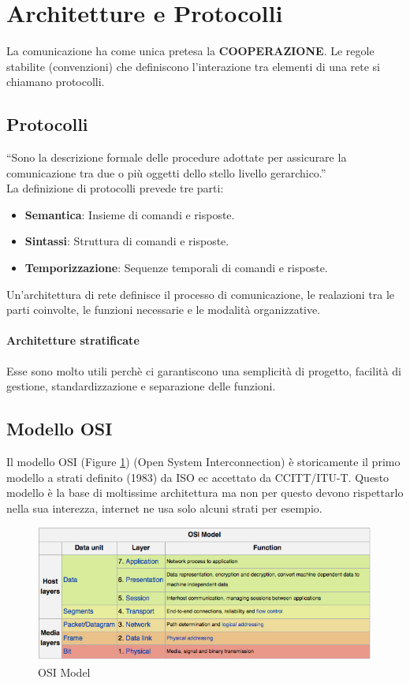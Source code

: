 \documentclass[12pt]{article}
\begin{document}
\section{Architetture e Protocolli}
La comunicazione ha come unica pretesa la \textbf{COOPERAZIONE}. Le regole stabilite (convenzioni) che definiscono l'interazione tra elementi di una rete si chiamano protocolli.
\subsection{Protocolli}
``Sono la descrizione formale delle procedure adottate per assicurare la comunicazione tra due o più oggetti dello stello livello gerarchico.''\\
La definizione di protocolli prevede tre parti:
\begin{itemize}
  \item \textbf{Semantica}: Insieme di comandi e risposte.
  \item \textbf{Sintassi}: Struttura di comandi e risposte.
  \item \textbf{Temporizzazione}: Sequenze temporali di comandi e risposte.
\end{itemize}
Un'architettura di rete definisce il processo di comunicazione, le realazioni tra le parti coinvolte, le funzioni necessarie e le modalità organizzative.
\paragraph{Architetture stratificate}
Esse sono molto utili perchè ci garantiscono una semplicità di progetto, facilità di gestione, standardizzazione e separazione delle funzioni.

\subsection{Modello OSI}
Il modello OSI (Figure \ref{fig:osimodel}) (Open System Interconnection) è storicamente il primo modello a strati definito (1983) da ISO ec accettato da CCITT/ITU-T. Questo modello è la base di moltissime architettura ma non per questo devono rispettarlo nella sua interezza, internet ne usa solo alcuni strati per esempio.
\begin{figure}[!h]
  \centering
  \includegraphics[width=\linewidth]{images/osimodel.jpg}
  \caption{OSI Model}
  \label{fig:osimodel}
\end{figure}
\end{document}
